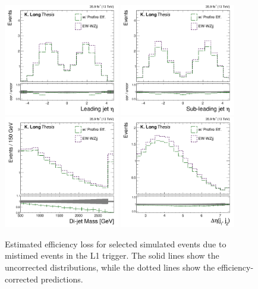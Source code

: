 \begin{figure}[htbp]
  \centering
   \includegraphics[width=0.45\textwidth]{figures/AnalysisProcedure/jet0Eta_prefiring.pdf}
   \includegraphics[width=0.45\textwidth]{figures/AnalysisProcedure/jet1Eta_prefiring.pdf}
   \includegraphics[width=0.45\textwidth]{figures/AnalysisProcedure/mjj_prefiring.pdf}
   \includegraphics[width=0.45\textwidth]{figures/AnalysisProcedure/dEtajj_prefiring.pdf}
  \caption{
      Estimated efficiency loss for selected \EWWZ simulated events due to 
      mistimed events in the L1 trigger. The solid lines show the uncorrected
      distributions, while the dotted lines show the efficiency-corrected 
      predictions.
        }
 \label{fig:signalPrefiringEff}
\end{figure}

